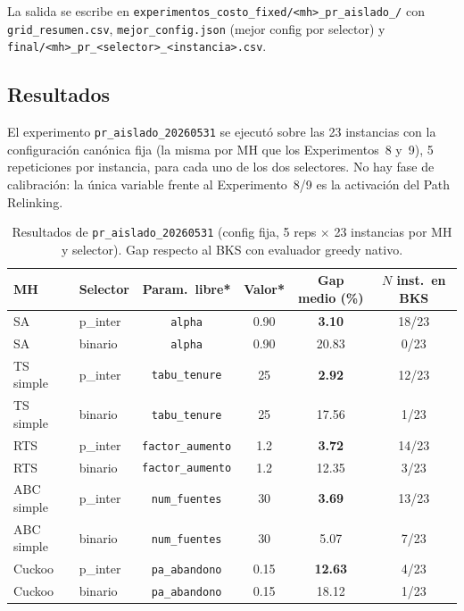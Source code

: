La salida se escribe en
\texttt{experimentos\_costo\_fixed/<mh>\_pr\_aislado\_<YYYYMMDD-HHMM>/} con
\texttt{grid\_resumen.csv}, \texttt{mejor\_config.json} (mejor config por
selector) y \texttt{final/<mh>\_pr\_<selector>\_<instancia>.csv}.

\subsection{Resultados}

\begin{observacion}
El experimento \texttt{pr\_aislado\_20260531} se ejecutó sobre las 23 instancias
con la configuración canónica fija (la misma por MH que los Experimentos~8 y~9),
5 repeticiones por instancia, para cada uno de los dos selectores. No hay fase
de calibración: la única variable frente al Experimento~8/9 es la activación del
Path Relinking.
\end{observacion}

\begin{table}[h]
\centering
\caption{Resultados de \texttt{pr\_aislado\_20260531} (config fija, 5 reps
         $\times$ 23 instancias por MH y selector). Gap respecto al BKS con
         evaluador greedy nativo.}
\label{tab:pr-aislado-resultados}
\small
\begin{tabular}{llcccc}
\toprule
MH & Selector & Param.\ libre* & Valor* & Gap medio (\%) & $N$ inst.\ en BKS \\
\midrule
SA           & p\_inter & \texttt{alpha}           & 0.90 & \textbf{3.10}  & 18/23 \\
SA           & binario  & \texttt{alpha}           & 0.90 & 20.83 & 0/23 \\
TS simple    & p\_inter & \texttt{tabu\_tenure}    & 25   & \textbf{2.92}  & 12/23 \\
TS simple    & binario  & \texttt{tabu\_tenure}    & 25   & 17.56 & 1/23 \\
RTS          & p\_inter & \texttt{factor\_aumento} & 1.2  & \textbf{3.72}  & 14/23 \\
RTS          & binario  & \texttt{factor\_aumento} & 1.2  & 12.35 & 3/23 \\
ABC simple   & p\_inter & \texttt{num\_fuentes}    & 30   & \textbf{3.69}  & 13/23 \\
ABC simple   & binario  & \texttt{num\_fuentes}    & 30   & 5.07  & 7/23 \\
Cuckoo       & p\_inter & \texttt{pa\_abandono}    & 0.15 & \textbf{12.63} & 4/23 \\
Cuckoo       & binario  & \texttt{pa\_abandono}    & 0.15 & 18.12 & 1/23 \\
\bottomrule
\end{tabular}
\end{table}


